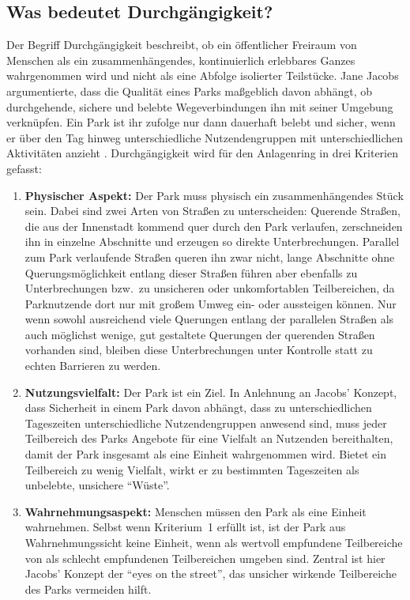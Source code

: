 \documentclass[a4paper,12pt]{article}
\begin{document}
\subsection{Was bedeutet Durchgängigkeit?}

Der Begriff Durchgängigkeit beschreibt, ob ein öffentlicher Freiraum von Menschen als ein zusammenhängendes, kontinuierlich erlebbares Ganzes wahrgenommen wird und nicht als eine Abfolge isolierter Teilstücke. Jane Jacobs argumentierte, dass die Qualität eines Parks maßgeblich davon abhängt, ob durchgehende, sichere und belebte Wegeverbindungen ihn mit seiner Umgebung verknüpfen. Ein Park ist ihr zufolge nur dann dauerhaft belebt und sicher, wenn er über den Tag hinweg unterschiedliche Nutzendengruppen mit unterschiedlichen Aktivitäten anzieht \autocite{jacobs1961}. Durchgängigkeit wird für den Anlagenring in drei Kriterien gefasst:

\begin{enumerate}
	\item \textbf{Physischer Aspekt:} Der Park muss physisch ein zusammenhängendes Stück sein. Dabei sind zwei Arten von Straßen zu unterscheiden: Querende Straßen, die aus der Innenstadt kommend quer durch den Park verlaufen, zerschneiden ihn in einzelne Abschnitte und erzeugen so direkte Unterbrechungen. Parallel zum Park verlaufende Straßen queren ihn zwar nicht, lange Abschnitte ohne Querungsmöglichkeit entlang dieser Straßen führen aber ebenfalls zu Unterbrechungen bzw.\ zu unsicheren oder unkomfortablen Teilbereichen, da Parknutzende dort nur mit großem Umweg ein- oder aussteigen können. Nur wenn sowohl ausreichend viele Querungen entlang der parallelen Straßen als auch möglichst wenige, gut gestaltete Querungen der querenden Straßen vorhanden sind, bleiben diese Unterbrechungen unter Kontrolle statt zu echten Barrieren zu werden.
	\item \textbf{Nutzungsvielfalt:} Der Park ist ein Ziel. In Anlehnung an Jacobs' Konzept, dass Sicherheit in einem Park davon abhängt, dass zu unterschiedlichen Tageszeiten unterschiedliche Nutzendengruppen anwesend sind, muss jeder Teilbereich des Parks Angebote für eine Vielfalt an Nutzenden bereithalten, damit der Park insgesamt als eine Einheit wahrgenommen wird. Bietet ein Teilbereich zu wenig Vielfalt, wirkt er zu bestimmten Tageszeiten als unbelebte, unsichere \enquote{Wüste}.
	\item \textbf{Wahrnehmungsaspekt:} Menschen müssen den Park als eine Einheit wahrnehmen. Selbst wenn Kriterium~1 erfüllt ist, ist der Park aus Wahrnehmungssicht keine Einheit, wenn als wertvoll empfundene Teilbereiche von als schlecht empfundenen Teilbereichen umgeben sind. Zentral ist hier Jacobs' Konzept der \enquote{eyes on the street}, das unsicher wirkende Teilbereiche des Parks vermeiden hilft.
\end{enumerate}
\end{document}
